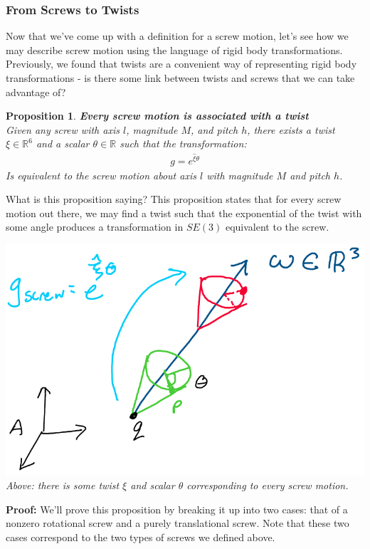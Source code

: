 \documentclass[oneside]{book}
\newtheorem{proposition}{Proposition}
\newenvironment{prop} %
  {\colorlet{shadecolor}{blue!9}\begin{shaded}\begin{proposition}}
  {\end{proposition}\end{shaded}}
\begin{document}
\subsubsection{From Screws to Twists}
Now that we've come up with a definition for a screw motion, let's see how we may describe screw motion using the language of rigid body transformations. Previously, we found that twists are a convenient way of representing rigid body transformations - is there some link between twists and screws that we can take advantage of?
\begin{prop}
\textbf{Every screw motion is associated with a twist}\\
Given any screw with axis $l$, magnitude $M$, and pitch $h$, there exists a twist $\xi \in \mathbb{R}^6$ and a scalar $\theta \in \mathbb{R}$ such that the transformation:
\begin{align}
    g = e^{\hat\xi\theta}
\end{align}
Is equivalent to the screw motion about axis $l$ with magnitude $M$ and pitch $h$.
\end{prop}
\noindent
What is this proposition saying? This proposition states that for every screw motion out there, we may find a twist such that the exponential of the twist with some angle produces a transformation in $SE(3)$ equivalent to the screw.
\begin{center}
    \includegraphics[scale=0.3]{images/screwTwist.png}\\
    \textit{Above: there is some twist $\xi$ and scalar $\theta$ corresponding to every screw motion.}
\end{center}
\textbf{Proof:} We'll  prove this proposition by breaking it up into two cases: that of a nonzero rotational screw and a purely translational screw. Note that these two cases correspond to the two types of screws we defined above.\\
\end{document}
